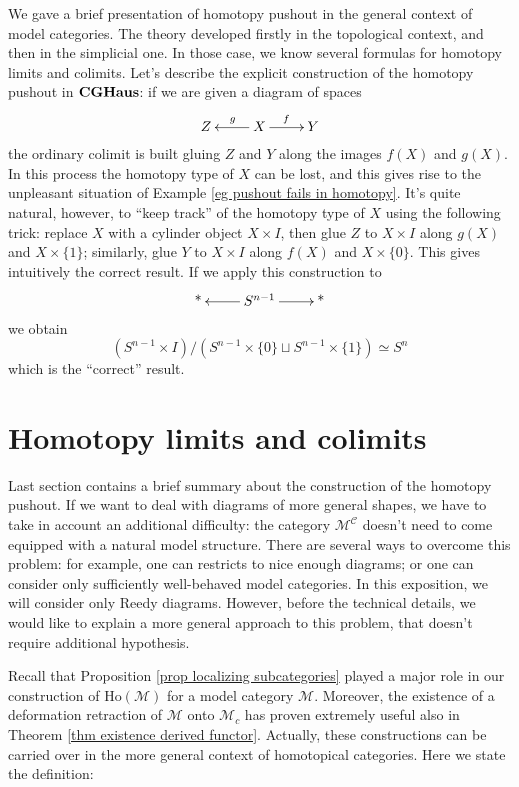 \begin{rmk}
We gave a brief presentation of homotopy pushout in the general context of model categories. The theory developed firstly in the topological context, and then in the simplicial one. In those case, we know several formulas for homotopy limits and colimits. Let's describe the explicit construction of the homotopy pushout in $\mathbf{CGHaus}$: if we are given a diagram of spaces
\[
\xymatrix{
Z & X \ar[l]_g \ar[r]^f & Y
}
\]
the ordinary colimit is built gluing $Z$ and $Y$ along the images $f(X)$ and $g(X)$. In this process the homotopy type of $X$ can be lost, and this gives rise to the unpleasant situation of Example \ref{eg pushout fails in homotopy}. It's quite natural, however, to ``keep track'' of the homotopy type of $X$ using the following trick: replace $X$ with a cylinder object $X \times I$, then glue $Z$ to $X \times I$ along $g(X)$ and $X \times \{1\}$; similarly, glue $Y$ to $X \times I$ along $f(X)$ and $X \times \{0\}$. This gives intuitively the correct result. If we apply this construction to
\[
\xymatrix{
\text{*} & S^{n-1} \ar[r] \ar[l] & \text{*}
}
\]
we obtain
\[
(S^{n-1} \times I) / (S^{n-1} \times \{0\} \sqcup S^{n-1} \times \{1\}) \simeq S^n
\]
which is the ``correct'' result.
\end{rmk}

\section{Homotopy limits and colimits} \label{homotopy limits}

Last section contains a brief summary about the construction of the homotopy pushout. If we want to deal with diagrams of more general shapes, we have to take in account an additional difficulty: the category $\mathcal M^{\mathcal C}$ doesn't need to come equipped with a natural model structure. There are several ways to overcome this problem: for example, one can restricts to nice enough diagrams; or one can consider only sufficiently well-behaved model categories. In this exposition, we will consider only Reedy diagrams. However, before the technical details, we would like to explain a more general approach to this problem, that doesn't require additional hypothesis.

Recall that Proposition \ref{prop localizing subcategories} played a major role in our construction of $\mathrm{Ho}(\mathcal M)$ for a model category $\mathcal M$. Moreover, the existence of a deformation retraction of $\mathcal M$ onto $\mathcal M_c$ has proven extremely useful also in Theorem \ref{thm existence derived functor}. Actually, these constructions can be carried over in the more general context of homotopical categories. Here we state the definition:

